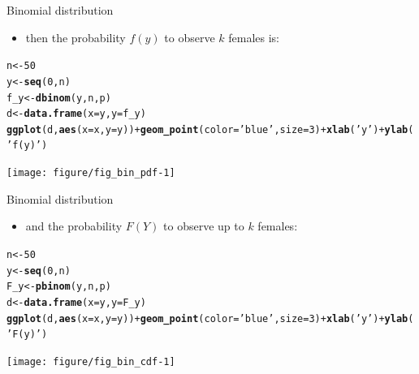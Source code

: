 \documentclass{beamer}\usepackage[]{graphicx}\usepackage[]{color}
\makeatletter
\newcommand{\hlnum}[1]{\textcolor[rgb]{0.686,0.059,0.569}{#1}}%
\newcommand{\hlstr}[1]{\textcolor[rgb]{0.192,0.494,0.8}{#1}}%
\newcommand{\hlopt}[1]{\textcolor[rgb]{0,0,0}{#1}}%
\newcommand{\hlstd}[1]{\textcolor[rgb]{0.345,0.345,0.345}{#1}}%
\newcommand{\hlkwb}[1]{\textcolor[rgb]{0.69,0.353,0.396}{#1}}%
\newcommand{\hlkwc}[1]{\textcolor[rgb]{0.333,0.667,0.333}{#1}}%
\newcommand{\hlkwd}[1]{\textcolor[rgb]{0.737,0.353,0.396}{\textbf{#1}}}%
\newenvironment{kframe}{%
 \def\at@end@of@kframe{}%
 \ifinner\ifhmode%
  \def\at@end@of@kframe{\end{minipage}}%
  \begin{minipage}{\columnwidth}%
 \fi\fi%
 \def\FrameCommand##1{\hskip\@totalleftmargin \hskip-\fboxsep
 \colorbox{shadecolor}{##1}\hskip-\fboxsep
     \hskip-\linewidth \hskip-\@totalleftmargin \hskip\columnwidth}%
 \MakeFramed {\advance\hsize-\width
   \@totalleftmargin\z@ \linewidth\hsize
   \@setminipage}}%
 {\par\unskip\endMakeFramed%
 \at@end@of@kframe}
\newenvironment{knitrout}{}{} %
\makeatother
\begin{document}
\begin{frame}[fragile]{Binomial distribution}
  \begin{itemize}
    \item then the probability $f(y)$ to observe $k$ females is:
  \end{itemize}
\begin{knitrout}\tiny
{}\color{fgcolor}\begin{kframe}
\begin{alltt}
\hlstd{n} \hlkwb{<-} \hlnum{50}
\hlstd{y} \hlkwb{<-} \hlkwd{seq}\hlstd{(}\hlnum{0}\hlstd{, n)}
\hlstd{f_y} \hlkwb{<-} \hlkwd{dbinom}\hlstd{(y, n, p)}
\hlstd{d} \hlkwb{<-} \hlkwd{data.frame}\hlstd{(}\hlkwc{x}\hlstd{=y,} \hlkwc{y}\hlstd{=f_y)}
\hlkwd{ggplot}\hlstd{(d,} \hlkwd{aes}\hlstd{(}\hlkwc{x}\hlstd{=x,} \hlkwc{y}\hlstd{=y))} \hlopt{+} \hlkwd{geom_point}\hlstd{(}\hlkwc{color}\hlstd{=}\hlstr{'blue'}\hlstd{,} \hlkwc{size}\hlstd{=}\hlnum{3}\hlstd{)} \hlopt{+} \hlkwd{xlab}\hlstd{(}\hlstr{'y'}\hlstd{)} \hlopt{+} \hlkwd{ylab}\hlstd{(}\hlstr{'f(y)'}\hlstd{)}
\end{alltt}
\end{kframe}

{\centering \texttt{[image: figure/fig\_bin\_pdf-1]} 

}



\end{knitrout}
\end{frame}

\begin{frame}[fragile]{Binomial distribution}
  \begin{itemize}
    \item and the probability $F(Y)$ to observe up to $k$ females:
  \end{itemize}
\begin{knitrout}\tiny
{}\color{fgcolor}\begin{kframe}
\begin{alltt}
\hlstd{n} \hlkwb{<-} \hlnum{50}
\hlstd{y} \hlkwb{<-} \hlkwd{seq}\hlstd{(}\hlnum{0}\hlstd{, n)}
\hlstd{F_y} \hlkwb{<-} \hlkwd{pbinom}\hlstd{(y, n, p)}
\hlstd{d} \hlkwb{<-} \hlkwd{data.frame}\hlstd{(}\hlkwc{x}\hlstd{=y,} \hlkwc{y}\hlstd{=F_y)}
\hlkwd{ggplot}\hlstd{(d,} \hlkwd{aes}\hlstd{(}\hlkwc{x}\hlstd{=x,} \hlkwc{y}\hlstd{=y))} \hlopt{+} \hlkwd{geom_point}\hlstd{(}\hlkwc{color}\hlstd{=}\hlstr{'blue'}\hlstd{,} \hlkwc{size}\hlstd{=}\hlnum{3}\hlstd{)} \hlopt{+} \hlkwd{xlab}\hlstd{(}\hlstr{'y'}\hlstd{)} \hlopt{+} \hlkwd{ylab}\hlstd{(}\hlstr{'F(y)'}\hlstd{)}
\end{alltt}
\end{kframe}

{\centering \texttt{[image: figure/fig\_bin\_cdf-1]} 

}



\end{knitrout}
\end{frame}
\end{document}
